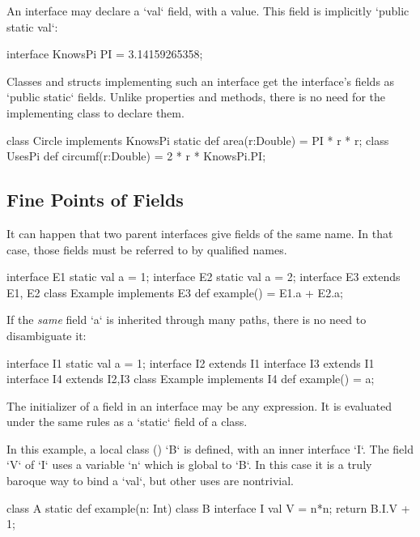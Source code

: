 An interface may declare a \xcd`val` field, with a value.  This field is implicitly
\xcd`public static val`: 
\begin{xten}
interface KnowsPi {
  PI = 3.14159265358;
}
\end{xten}
%

Classes and structs implementing such an interface get the interface's fields as
\xcd`public static` fields.  Unlike properties and methods, there is no need
for the implementing class to declare them. 
\begin{xten}
class Circle implements KnowsPi {
  static def area(r:Double) = PI * r * r;
}
class UsesPi {
  def circumf(r:Double) = 2 * r * KnowsPi.PI;
}
\end{xten}
%

\subsection{Fine Points of Fields}

It can happen that two parent interfaces give fields of the same name.  In
that case, those fields must be referred to by qualified names.
% 
\begin{xten}
interface E1 {static val a = 1;}
interface E2 {static val a = 2;}
interface E3 extends E1, E2{}
class Example implements E3 {
  def example() = E1.a + E2.a;
}
\end{xten}
%

If the {\em same} field \xcd`a` is inherited through many paths, there is no need to
disambiguate it:
\begin{xten}
interface I1 { static val a = 1;} 
interface I2 extends I1 {}
interface I3 extends I1 {}
interface I4 extends I2,I3 {}
class Example implements I4 {
  def example() = a;
}
\end{xten}
%

The initializer of a field in an interface may be any expression.  It is
evaluated under the same rules as a \xcd`static` field of a class. 

\begin{eg}
In this example, a local class () \xcd`B` is defined,
with an inner interface \xcd`I`.  The field \xcd`V` of \xcd`I` uses a variable
\xcd`n` which is global to \xcd`B`.   In this case it is a truly baroque way
to bind a \xcd`val`, but other uses are nontrivial.

\begin{xten}
class A {
  static def example(n: Int) {
    class B {
      interface I { val V = n*n; }
    }
   return B.I.V + 1;
  }
}
\end{xten}
\end{eg}

